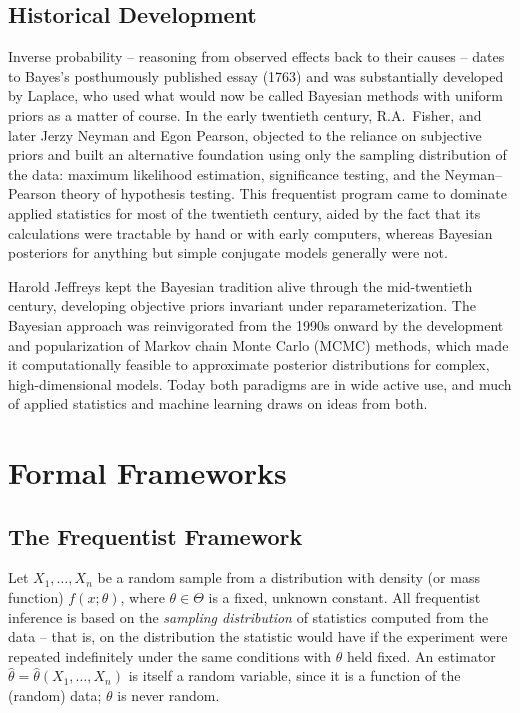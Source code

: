 \documentclass[11pt,a4paper]{article}
\begin{document}
\subsection{Historical Development}
Inverse probability -- reasoning from observed effects back to their causes -- dates to Bayes's posthumously published essay (1763) and was substantially developed by Laplace, who used what would now be called Bayesian methods with uniform priors as a matter of course. In the early twentieth century, R.A.~Fisher, and later Jerzy Neyman and Egon Pearson, objected to the reliance on subjective priors and built an alternative foundation using only the sampling distribution of the data: maximum likelihood estimation, significance testing, and the Neyman--Pearson theory of hypothesis testing. This frequentist program came to dominate applied statistics for most of the twentieth century, aided by the fact that its calculations were tractable by hand or with early computers, whereas Bayesian posteriors for anything but simple conjugate models generally were not.

Harold Jeffreys kept the Bayesian tradition alive through the mid-twentieth century, developing objective priors invariant under reparameterization. The Bayesian approach was reinvigorated from the 1990s onward by the development and popularization of Markov chain Monte Carlo (MCMC) methods, which made it computationally feasible to approximate posterior distributions for complex, high-dimensional models. Today both paradigms are in wide active use, and much of applied statistics and machine learning draws on ideas from both.

\section{Formal Frameworks}

\subsection{The Frequentist Framework}
Let $X_1, \dots, X_n$ be a random sample from a distribution with density (or mass function) $f(x; \theta)$, where $\theta \in \Theta$ is a fixed, unknown constant. All frequentist inference is based on the \emph{sampling distribution} of statistics computed from the data -- that is, on the distribution the statistic would have if the experiment were repeated indefinitely under the same conditions with $\theta$ held fixed. An estimator $\hat\theta = \hat\theta(X_1,\dots,X_n)$ is itself a random variable, since it is a function of the (random) data; $\theta$ is never random.
\end{document}
